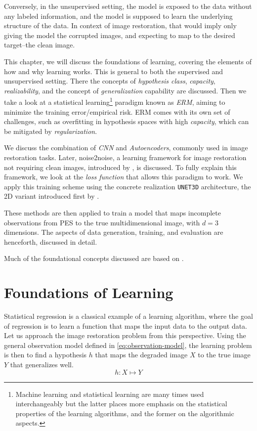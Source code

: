 Conversely, in the unsupervised setting, the model is exposed to the data without any labeled information, and the model is supposed to learn the underlying structure of the data. In context of image restoration, that would imply only giving the model the corrupted images, and expecting to map to the desired target--the clean image.

This chapter, we will discuss the foundations of learning, covering the elements of how and why learning works. This is general to both the supervised and unsupervised setting. There the concepts of \textit{hypothesis class}, \textit{capacity}, \textit{realizability}, and the concept of \textit{generalization} capability are discussed. Then we take a look at a statistical learning\footnote{Machine learning and statistical learning are many times used interchangeably but the latter places more emphasis on the statistical properties of the learning algorithms, and the former on the algorithmic aspects.} paradigm known as \textit{\gls{ERM}}, aiming to minimize the training error/empirical risk. \Gls{ERM} comes with its own set of challenges, such as overfitting in hypothesis spaces with high \textit{capacity}, which can be mitigated by \textit{regularization}. 

We discuss the combination of \textit{\gls{CNN}} and \textit{Autoencoders}, commonly used in image restoration tasks. Later, \gls{noise2noise}, a learning framework for image restoration not requiring clean images, introduced by \citeauthor{lehtinenNoise2NoiseLearningImage2018}, is discussed. To fully explain this framework, we look at the \textit{loss function} that allows this paradigm to work. We apply this training scheme using the concrete realization \texttt{UNET3D} architecture, the 2D variant introduced first by \citeauthor{ronnebergerUNetConvolutionalNetworks}.

These methods are then applied to train a model that maps incomplete observations from \gls{PES} to the true multidimensional image, with $d=3$ dimensions. The aspects of data generation, training, and evaluation are henceforth, discussed in detail.

Much of the foundational concepts discussed are based on \cite{shalev-shwartzUnderstandingMachineLearning2014a,jamesIntroductionStatisticalLearning2013,tibshiraniElementsStatisticalLearning,goodfellowDeepLearning2016}.

\section{Foundations of Learning}
Statistical regression is a classical example of a learning algorithm, where the goal of regression is to learn a function that maps the input data to the output data.
Let us approach the image restoration problem from this perspective. Using the general observation model defined in \cref{eq:observation-model}, the learning problem is then to find a hypothesis $h$ that maps the degraded image $X$ to the true image $Y$ that generalizes well.
\begin{equation}
    h: X \mapsto Y
\end{equation}

